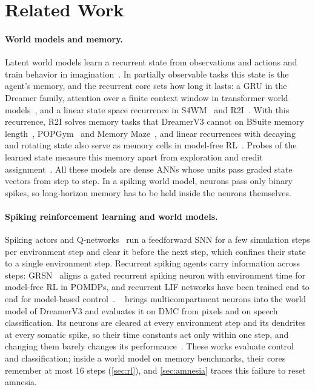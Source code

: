 \section{Related Work}
\label{sec:related}

\paragraph{World models and memory.}
Latent world models learn a recurrent state from observations and actions and train behavior in imagination~\cite{ha2018world,hafner2019planet,hafner2020dreamer,hafner2021dreamerv2,hafner2025dreamerv3}.
In partially observable tasks this state is the agent's memory, and the recurrent core sets how long it lasts: a GRU in the Dreamer family, attention over a finite context window in transformer world models~\cite{micheli2023iris,robine2023twm,zhang2023storm}, and a linear state space recurrence in S4WM~\cite{deng2023s4wm} and R2I~\cite{samsami2024r2i}.
With this recurrence, R2I solves memory tasks that DreamerV3 cannot on BSuite memory length~\cite{osband2020bsuite}, POPGym~\cite{morad2023popgym} and Memory Maze~\cite{pasukonis2023memorymaze}, and linear recurrences with decaying and rotating state also serve as memory cells in model-free RL~\cite{orvieto2023lru,voelker2019lmu,lu2023s5icrl,morad2023ffm}.
Probes of the learned state measure this memory apart from exploration and credit assignment~\cite{pasukonis2023memorymaze,wijmans2023maps,ni2023transformers}.
All these models are dense ANNs whose units pass graded state vectors from step to step.
In a spiking world model, neurons pass only binary spikes, so long-horizon memory has to be held inside the neurons themselves.

\paragraph{Spiking reinforcement learning and world models.}
Spiking actors and Q-networks~\cite{tang2020popsan,liu2023dsqn} run a feedforward SNN for a few simulation steps per environment step and clear it before the next step, which confines their state to a single environment step.
Recurrent spiking agents carry information across steps: GRSN~\cite{qin2025grsn} aligns a gated recurrent spiking neuron with environment time for model-free RL in POMDPs, and recurrent LIF networks have been trained end to end for model-based control~\cite{huebotter2025spiking}.
\swm~\cite{sun2025spikingwm} brings multicompartment neurons into the world model of DreamerV3 and evaluates it on DMC from pixels and on speech classification.
Its neurons are cleared at every environment step and its dendrites at every somatic spike, so their time constants act only within one step, and changing them barely changes its performance~\cite{sun2025spikingwm}.
These works evaluate control and classification; inside a world model on memory benchmarks, their cores remember at most 16 steps (\cref{sec:rl}), and \cref{sec:amnesia} traces this failure to reset amnesia.

